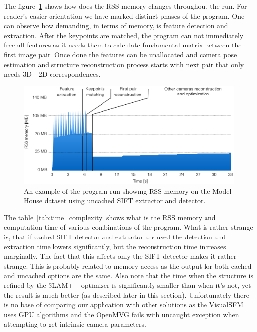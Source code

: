The figure~\ref{fig:rss_memory} shows how does the RSS memory changes throughout the run. For reader's easier orientation we have marked distinct phases of the program. One can observe how demanding, in terms of memory, is feature detection and extraction. After the keypoints are matched, the program can not immediately free all features as it needs them to calculate fundamental matrix between the first image pair. Once done the features can be unallocated and camera pose estimation and structure reconstruction process starts with next pair that only needs 3D - 2D correspondences.

\begin{figure}[!htbp]
	\begin{center}
		\includegraphics[keepaspectratio,width=\textwidth]{fig/exp_model_house_memory.pdf}
	\end{center}
	\caption{An example of the program run showing RSS memory on the Model House dataset using uncached SIFT extractor and detector.}
	\label{fig:rss_memory}
\end{figure} 

The table~\ref{tab:time_complexity} shows what is the RSS memory and computation time of various combinations of the program. What is rather strange is, that if cached SIFT detector and extractor are used the detection and extraction time lowers significantly, but the reconstruction time increases marginally. The fact that this affects only the SIFT detector makes it rather strange. This is probably related to memory access as the output for both cached and uncached options are the same. Also note that the time when the structure is refined by the SLAM++ optimizer is significantly smaller than when it's not, yet the result is much better (as described later in this section). Unfortunately there is no base of comparing our application with other solutions as the VisualSFM uses GPU algorithms and the OpenMVG fails with uncaught exception when attempting to get intrinsic camera parameters.

